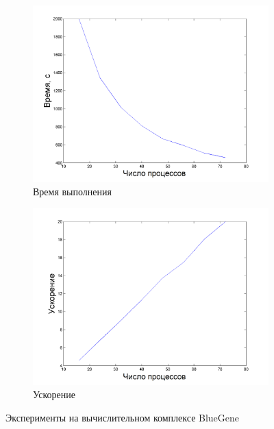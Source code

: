 \documentclass[a4paper,12pt]{report}
\begin{document}
	\begin{figure}[H]
			\begin{subfigure}{0.5\textwidth}
				\includegraphics[width=\textwidth]{mpi_bg.png}
				\caption{Время выполнения}
			\end{subfigure}
			\begin{subfigure}{0.5\textwidth}
				\includegraphics[width=\textwidth]{mpi_bg_speedup.png}
				\caption{Ускорение}
			\end{subfigure}
			\caption{Эксперименты на вычислительном комплексе BlueGene}
			\label{bg}
		\end{figure}\par
\end{document}
